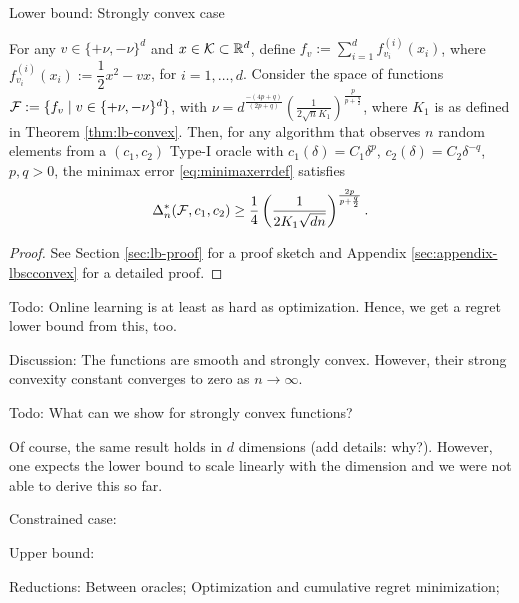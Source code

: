 Lower bound: Strongly convex case
\begin{theorem}
\label{thm:lb-strongly-convex}
For any $v \in \{+\nu,-\nu\}^d$ and $x \in \mathcal{K}\subset \mathbb{R}^d$, define $f_v := \sum_{i=1}^d f^{(i)}_{v_i}(x_i)$, where
$f^{(i)}_{v_i}(x_i) := \dfrac{1}{2} x^2 - v x$, for $i=1,\ldots,d$.
Consider the space of functions $\mathcal{F}:= \{f_v \mid v  \in \{+\nu,-\nu\}^d\}$, with $\nu = d^{\frac{-(4p+q)}{(2p+q)}}\left(\frac{1}{2\sqrt{n} K_1} \right)^{\frac{p}{p+\frac{q}{2}}}$, where $K_1$ is as defined in Theorem \ref{thm:lb-convex}. 
Then, for any algorithm that observes $n$ random elements from a $(c_1,c_2)$ Type-I oracle 
 with $c_1(\delta) = C_1 \delta^p$, $c_2(\delta) = C_2 \delta^{-q}$, $p,q>0$,
 the minimax error \eqref{eq:minimaxerrdef} satisfies
\[
\Delta_n^{*}(\mathcal{F}, c_1,c_2) \ge \dfrac{1}{4}  \left(\dfrac{1}{2 K_1 \sqrt {d n}}\right)^{\frac{2p}{p+\frac{q}{2}}}.
\]
\end{theorem}
\begin{proof}
 See Section \ref{sec:lb-proof} for a proof sketch and Appendix \ref{sec:appendix-lbscconvex} for a detailed proof.
\end{proof}





Todo: Online learning is at least as hard as optimization. Hence, we get a regret lower bound from this, too.

Discussion: The functions are smooth and strongly convex.
However, their strong convexity constant converges to zero as $n\to\infty$.

Todo: What can we show for strongly convex functions?

Of course, the same result holds in $d$ dimensions (add details: why?). However, one expects the lower bound to scale linearly with the dimension and we were not able to derive this so far.

Constrained case:

Upper bound: 

Reductions:
Between oracles;
Optimization and cumulative regret minimization;


